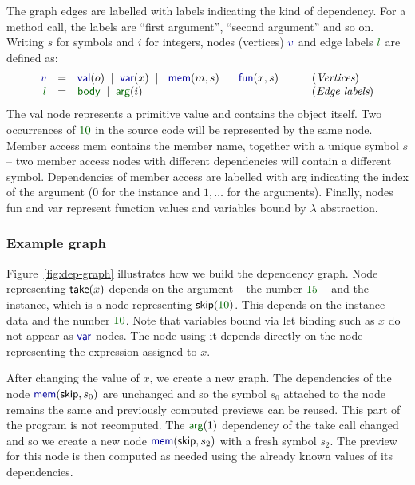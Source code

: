 \documentclass[english,crc]{programming}
\theoremstyle{plain}
\theoremstyle{definition}
\newcommand{\lsep}{\;\;|\;\;}
\newcommand{\num}[1]{\textcolor{numclr}{#1}}
\newcommand{\ident}[1]{\textnormal{\textcolor{idclr}{\sffamily #1}}}
\newcommand{\kvd}[1]{\textnormal{\textcolor{kvdclr}{\sffamily #1}}}
\newcommand{\bndclr}[1]{\textcolor{kvdclr}{#1}}
\newcommand{\blblclr}[1]{\textcolor{numclr}{#1}}
\newcommand{\bnd}[1]{\textnormal{\textcolor{kvdclr}{\sffamily #1}}}
\newcommand{\blbl}[1]{\textnormal{\textcolor{numclr}{\sffamily #1}}}
\begin{document}
The graph edges are labelled with labels indicating the kind of dependency. For
a method call, the labels are ``first argument'', ``second argument'' and so on. Writing
$s$ for symbols and $i$ for integers, nodes (vertices) $\bndclr{v}$ and edge labels $\blblclr{l}$
are defined as:
%
\begin{equation*}
\begin{array}{rcll}
\bndclr{v}&=&\bnd{val}(o) \lsep \bnd{var}(x)\lsep \bnd{mem}(m, s)\lsep \bnd{fun}(x, s)&\qquad(\textit{Vertices})\\
\blblclr{l}&=&\blbl{body} \lsep \blbl{arg}(i)&\qquad(\textit{Edge labels})\\
\end{array}
\end{equation*}
%
The \bnd{val} node represents a primitive value and contains the object itself. Two occurrences
of $\num{10}$ in the source code will be represented by the same node. Member access \bnd{mem}
contains the member name, together with a unique symbol $s$ -- two member access nodes with
different dependencies will contain a different symbol. Dependencies of member access are labelled
with \blbl{arg} indicating the index of the argument ($0$ for the instance and $1,\ldots$ for the
arguments). Finally, nodes \bnd{fun} and \bnd{var} represent function values and variables
bound by $\lambda$ abstraction.


\subsubsection{Example graph}
Figure~\ref{fig:dep-graph} illustrates how we build the
dependency graph. Node representing $\ident{take}(x)$ depends on the argument -- the
number $\num{15}$ -- and the instance, which is a node representing $\ident{skip}(\num{10})$.
This depends on the instance \ident{data} and the number $\num{10}$. Note that variables
bound via \kvd{let} binding such as $x$ do not appear as $\bnd{var}$ nodes. The node using it
depends directly on the node representing the expression assigned to $x$.

After changing the value of $x$, we create a new graph. The dependencies of the node
$\bnd{mem}(\ident{skip}, s_0)$ are unchanged and so the symbol $s_0$ attached to the node remains
the same and previously computed previews can be reused. This part of the program is not recomputed.
The $\blbl{arg}(1)$ dependency of the \ident{take} call
changed and so we create a new node $\bnd{mem}(\ident{skip}, s_2)$ with a fresh symbol $s_2$.
The preview for this node is then computed as needed using the already known values of its
dependencies.
\end{document}
